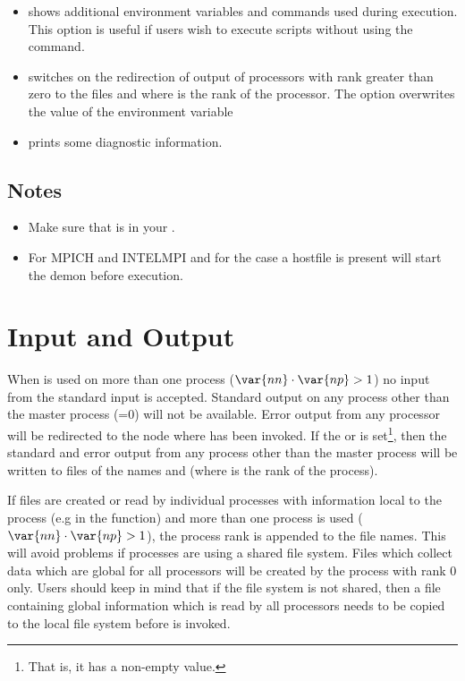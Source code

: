 \begin{itemize}
 \item[\programopt{-e}] shows additional environment variables and commands used during  execution. This option is useful if users wish to execute scripts without using the  command.

 \item[\programopt{-o}] switches on the redirection of output of processors with \MPI rank greater than zero to the files  and  where  is the rank of the processor. The option overwrites the value of the  environment variable 


 \item[\programopt{-v}] prints some diagnostic information.
\end{itemize}
\subsection{Notes}
\begin{itemize}
 \item Make sure that  is in your . 
 \item For MPICH and INTELMPI and for the case a hostfile is present 
 will start the  demon before execution.
\end{itemize}

\section{Input and Output}
When \MPI is used on more than one process ($\var{nn} \cdot \var{np} >1$) no input from the standard input is accepted. Standard output on any process other than the master process (=0) will not be available.
Error output from any processor will be redirected to the node where  has been invoked.
If the  or  is set\footnote{That is, it has a non-empty value.}, then the standard and error output from any process other than the master process will be written to files of the names  and  (where 
 is the rank of the process).

If files are created or read by individual \MPI processes with information local to the process (e.g in the  function)  and more than one process is used ($\var{nn} \cdot \var{np} >1$), the \MPI process rank is appended to the file names.
This will avoid problems if processes are using a shared file system.
Files which collect data which are global for all \MPI processors will be created by the process with \MPI rank 0 only.
Users should keep in mind that if the file system is not shared, then a file containing global information
which is read by all processors needs to be copied to the local file system before  is invoked.
 

